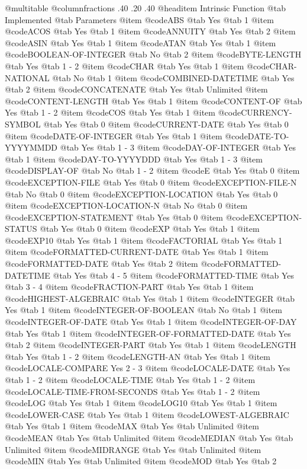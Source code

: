 @multitable @columnfractions .40 .20 .40
@headitem Intrinsic Function @tab Implemented @tab	Parameters
@item @code{ABS} @tab Yes @tab 1
@item @code{ACOS} @tab Yes @tab 1
@item @code{ANNUITY} @tab Yes @tab 2
@item @code{ASIN} @tab Yes @tab 1
@item @code{ATAN} @tab Yes @tab 1
@item @code{BOOLEAN-OF-INTEGER} @tab No @tab 2
@item @code{BYTE-LENGTH} @tab Yes @tab 1 - 2
@item @code{CHAR} @tab Yes @tab 1
@item @code{CHAR-NATIONAL} @tab No @tab 1
@item @code{COMBINED-DATETIME} @tab Yes @tab 2
@item @code{CONCATENATE} @tab Yes @tab Unlimited
@item @code{CONTENT-LENGTH} @tab Yes @tab 1
@item @code{CONTENT-OF} @tab Yes @tab 1 - 2
@item @code{COS} @tab Yes @tab 1
@item @code{CURRENCY-SYMBOL} @tab Yes @tab 0
@item @code{CURRENT-DATE} @tab Yes @tab 0
@item @code{DATE-OF-INTEGER} @tab Yes @tab 1
@item @code{DATE-TO-YYYYMMDD} @tab Yes @tab 1 - 3
@item @code{DAY-OF-INTEGER} @tab Yes @tab 1
@item @code{DAY-TO-YYYYDDD} @tab Yes @tab 1 - 3
@item @code{DISPLAY-OF} @tab No @tab 1 - 2
@item @code{E} @tab Yes @tab 0
@item @code{EXCEPTION-FILE} @tab Yes @tab 0
@item @code{EXCEPTION-FILE-N} @tab No @tab 0
@item @code{EXCEPTION-LOCATION} @tab Yes @tab 0
@item @code{EXCEPTION-LOCATION-N} @tab No @tab 0
@item @code{EXCEPTION-STATEMENT} @tab Yes @tab 0
@item @code{EXCEPTION-STATUS} @tab Yes @tab 0
@item @code{EXP} @tab Yes @tab 1
@item @code{EXP10} @tab Yes @tab 1
@item @code{FACTORIAL} @tab Yes @tab 1
@item @code{FORMATTED-CURRENT-DATE} @tab Yes @tab 1
@item @code{FORMATTED-DATE} @tab Yes @tab 2
@item @code{FORMATTED-DATETIME} @tab Yes @tab 4 - 5
@item @code{FORMATTED-TIME} @tab Yes @tab 3 - 4
@item @code{FRACTION-PART} @tab Yes @tab 1
@item @code{HIGHEST-ALGEBRAIC} @tab Yes @tab 1
@item @code{INTEGER} @tab Yes @tab 1
@item @code{INTEGER-OF-BOOLEAN} @tab No @tab 1
@item @code{INTEGER-OF-DATE} @tab Yes @tab 1
@item @code{INTEGER-OF-DAY} @tab Yes @tab 1
@item @code{INTEGER-OF-FORMATTED-DATE} @tab Yes @tab 2
@item @code{INTEGER-PART} @tab Yes @tab 1
@item @code{LENGTH} @tab Yes @tab 1 - 2
@item @code{LENGTH-AN} @tab Yes @tab 1
@item @code{LOCALE-COMPARE	Yes	2 - 3}
@item @code{LOCALE-DATE} @tab Yes @tab 1 - 2
@item @code{LOCALE-TIME} @tab Yes @tab 1 - 2
@item @code{LOCALE-TIME-FROM-SECONDS} @tab Yes @tab 1 - 2
@item @code{LOG} @tab Yes @tab 1
@item @code{LOG10} @tab Yes @tab 1
@item @code{LOWER-CASE} @tab Yes @tab 1
@item @code{LOWEST-ALGEBRAIC} @tab Yes @tab 1
@item @code{MAX} @tab Yes @tab Unlimited
@item @code{MEAN} @tab Yes @tab Unlimited
@item @code{MEDIAN} @tab Yes @tab Unlimited
@item @code{MIDRANGE} @tab Yes @tab Unlimited
@item @code{MIN} @tab Yes @tab Unlimited
@item @code{MOD} @tab Yes @tab 2
